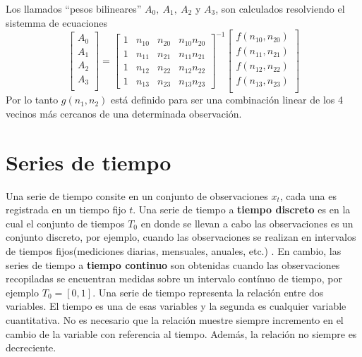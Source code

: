 Los llamados ``pesos bilineares''\cite{26} $A_0,~A_1,~A_2\text{ y }A_3$, son calculados resolviendo el sistemma de ecuaciones
\begin{equation}\label{interp2d}
    \begin{bmatrix}
        A_0 \\
        A_1 \\
        A_2 \\
        A_3 \\
    \end{bmatrix}
    =
    \begin{bmatrix}
        1 & n_{10} & n_{20} & n_{10}n_{20} \\
        1 & n_{11} & n_{21} & n_{11}n_{21} \\
        1 & n_{12} & n_{22} & n_{12}n_{22} \\
        1 & n_{13} & n_{23} & n_{13}n_{23} 
    \end{bmatrix}^{-1}
    \begin{bmatrix}
        f(n_{10},n_{20}) \\
        f(n_{11},n_{21}) \\
        f(n_{12},n_{22}) \\
        f(n_{13},n_{23}) \\
    \end{bmatrix}
\end{equation}
Por lo tanto $g(n_1,n_2)$ está definido para ser una combinación linear de los 4 vecinos más cercanos de una determinada observación.
%
%
%
%
\section{Series de tiempo}
Una serie de tiempo consite en un conjunto de observaciones $x_t$, cada una es registrada en un tiempo fijo $t$.
Una serie de tiempo a \textbf{tiempo discreto} es en la cual el conjunto de tiempos $T_0$ en donde se llevan a cabo las observaciones
es un conjunto discreto, por ejemplo, cuando las observaciones se realizan en intervalos de tiempos fijos(mediciones diarias, mensuales, anuales, etc.)
. En cambio, las series de tiempo a \textbf{tiempo continuo } son obtenidas cuando las observaciones recopiladas se encuentran medidas sobre un intervalo
contínuo de tiempo, por ejemplo $T_0=[0,1]$\cite{21}. Una serie de tiempo representa la relación entre dos variables. El tiempo es una de esas variables 
y la segunda es cualquier variable cuantitativa. No es necesario que la relación muestre siempre incremento en el cambio de la variable con referencia al tiempo. 
Además, la relación no siempre es decreciente.

